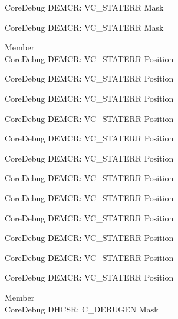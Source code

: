 \begin{DoxyRefList}
\label{deprecated__deprecated001172}%
%
Core\+Debug DEMCR\+: VC\+\_\+\+STATERR Mask 

\label{deprecated__deprecated001274}%
%
Core\+Debug DEMCR\+: VC\+\_\+\+STATERR Mask  
\item[Member \doxylink{group___c_m_s_i_s___core_debug_ga16f0d3d2ce1e1e8cd762d938ac56c4ac}{Core\+Debug\+\_\+\+DEMCR\+\_\+\+VC\+\_\+\+STATERR\+\_\+\+Pos} ]\hfill \\
\label{deprecated__deprecated000061}%
%
Core\+Debug DEMCR\+: VC\+\_\+\+STATERR Position 

\label{deprecated__deprecated000205}%
%
Core\+Debug DEMCR\+: VC\+\_\+\+STATERR Position 

\label{deprecated__deprecated000347}%
%
Core\+Debug DEMCR\+: VC\+\_\+\+STATERR Position 

\label{deprecated__deprecated000423}%
%
Core\+Debug DEMCR\+: VC\+\_\+\+STATERR Position 

\label{deprecated__deprecated000512}%
%
Core\+Debug DEMCR\+: VC\+\_\+\+STATERR Position 

\label{deprecated__deprecated000614}%
%
Core\+Debug DEMCR\+: VC\+\_\+\+STATERR Position 

\label{deprecated__deprecated000720}%
%
Core\+Debug DEMCR\+: VC\+\_\+\+STATERR Position 

\label{deprecated__deprecated000864}%
%
Core\+Debug DEMCR\+: VC\+\_\+\+STATERR Position 

\label{deprecated__deprecated001006}%
%
Core\+Debug DEMCR\+: VC\+\_\+\+STATERR Position 

\label{deprecated__deprecated001082}%
%
Core\+Debug DEMCR\+: VC\+\_\+\+STATERR Position 

\label{deprecated__deprecated001171}%
%
Core\+Debug DEMCR\+: VC\+\_\+\+STATERR Position 

\label{deprecated__deprecated001273}%
%
Core\+Debug DEMCR\+: VC\+\_\+\+STATERR Position  
\item[Member \doxylink{group___c_m_s_i_s___core_debug_gab815c741a4fc2a61988cd2fb7594210b}{Core\+Debug\+\_\+\+DHCSR\+\_\+\+C\+\_\+\+DEBUGEN\+\_\+\+Msk} ]\hfill \\
\label{deprecated__deprecated000040}%
%
Core\+Debug DHCSR\+: C\+\_\+\+DEBUGEN Mask 


\end{DoxyRefList}
